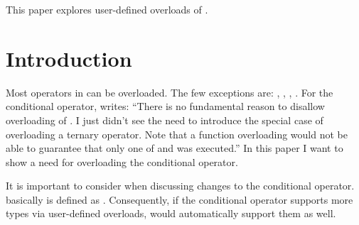 \newcommand\wgTitle{Making operator?: overloadable}
\newcommand\wgName{Matthias Kretz <m.kretz@gsi.de>}
\newcommand\wgDocumentNumber{D0917R4}
\newcommand\wgGroup{EWG-I}
\newcommand\wgTarget{\CC{}23}

\usepackage{mymacros}
\usepackage{wg21}
\usepackage{changelog}
\usepackage{underscore}



\newcommand\simd[1][]{\type{simd#1}\xspace}
\newcommand\simdT{\type{simd<T>}\xspace}
\newcommand\valuetype{\type{value\_type}\xspace}
\newcommand\referencetype{\type{reference}\xspace}
\newcommand\whereexpression{\type{where\_expression}\xspace}
\newcommand\simdcast{\code{simd\_cast}\xspace}
\newcommand\mask[1][]{\type{simd\_mask#1}\xspace}
\newcommand\maskT{\type{simd\_mask<T>}\xspace}
\newcommand\fixedsizeN{\type{simd\_abi::fixed\_size<N>}\xspace}
\newcommand\fixedsizescoped{\type{simd\_abi::fixed\_size}\xspace}
\newcommand\fixedsize{\type{fixed\_size}\xspace}
\newcommand\simdEP{\code{execution::}\type{simd}\xspace}
\newcommand\seqEP{\code{execution::}\type{seq}\xspace}


\begin{wgTitlepage}
  This paper explores user-defined overloads of .
\end{wgTitlepage}

\pagestyle{scrheadings}
\section{Introduction}
Most operators in \CC{} can be overloaded.
The few exceptions are: , \code{::}, , .
For the conditional operator, \textcite{StrFaq} writes:
“There is no fundamental reason to disallow overloading of .
I just didn't see the need to introduce the special case of overloading a ternary operator.
Note that a function overloading  would not be able to guarantee that only one of  and  was executed.”
In this paper I want to show a need for overloading the conditional operator.

It is important to consider  when discussing changes to the conditional operator.
 basically is defined as .
Consequently, if the conditional operator supports more types via user-defined overloads,  would automatically support them as well.

